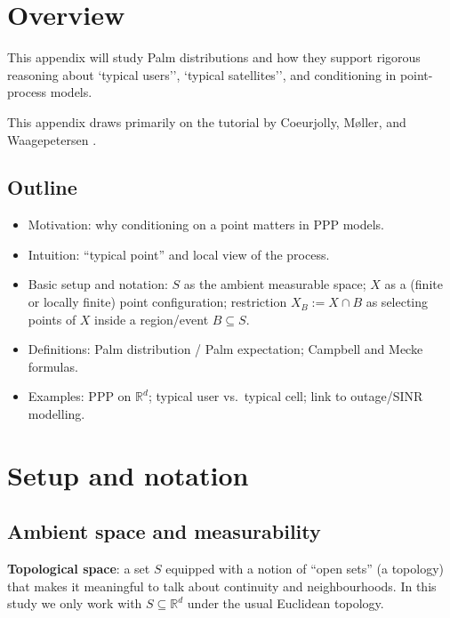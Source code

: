 
\section{Overview}
This appendix will study Palm distributions and how they support rigorous reasoning about `typical users'',
`typical satellites'', and conditioning in point-process models.

\noindent This appendix draws primarily on the tutorial by Coeurjolly, Møller, and Waagepetersen \cite{coeurjolly2017palm}.

\subsection{Outline}
\begin{itemize}
\item Motivation: why conditioning on a point matters in PPP models.
\item Intuition: ``typical point'' and local view of the process.
\item Basic setup and notation: $S$ as the ambient measurable space; $X$ as a (finite or locally finite) point configuration;
restriction $X_B := X \cap B$ as selecting points of $X$ inside a region/event $B \subseteq S$.
\item Definitions: Palm distribution / Palm expectation; Campbell and Mecke formulas.
\item Examples: PPP on $\mathbb{R}^d$; typical user vs.\ typical cell; link to outage/SINR modelling.
\end{itemize}

\section{Setup and notation}

\subsection{Ambient space and measurability}

\noindent\textbf{Topological space}: a set $S$ equipped with a notion of ``open sets'' (a topology) that makes it meaningful
to talk about continuity and neighbourhoods. In this study we only work with $S\subseteq\mathbb{R}^d$ under the usual
Euclidean topology.

